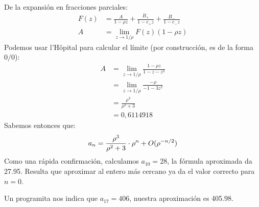   De la expansión en fracciones parciales:
  \begin{align*}
    F(z)
      &= \frac{A}{1 - \rho z}
          + \frac{B_+}{1 - c_+ z} + \frac{B_-}{1 - c_- z} \\
    A
      &= \lim_{z \to 1 / \rho} F(z) (1 - \rho z)
  \end{align*}
  Podemos usar l'Hôpital para calcular el límite
  (por construcción,
   es de la forma \(0 / 0\)):
  \begin{align*}
    A
      &= \lim_{z \to 1 / \rho}	\frac{1 - \rho z}{1 - z - z^3} \\
      &= \lim_{z \to 1 / \rho} \frac{- \rho}{-1 - 3 z^2} \\
      &= \frac{\rho^3}{\rho^2 + 3} \\
      &= 0,6114918
  \end{align*}
  Sabemos entonces que:
  \begin{equation*}
    a_n
      = \frac{\rho^3}{\rho^2 + 3} \cdot \rho^n
        + O(\rho^{-n/2}) \\
  \end{equation*}
  Como una rápida confirmación,
  calculamos \(a_{10} = 28\),
  la fórmula aproximada da \num{27,95}.
  Resulta que aproximar al entero más cercano
  ya da el valor correcto para \(n = 0\).

  Un programita nos indica que \(a_{17} = 406\),
  nuestra aproximación es \num{405,98}.



